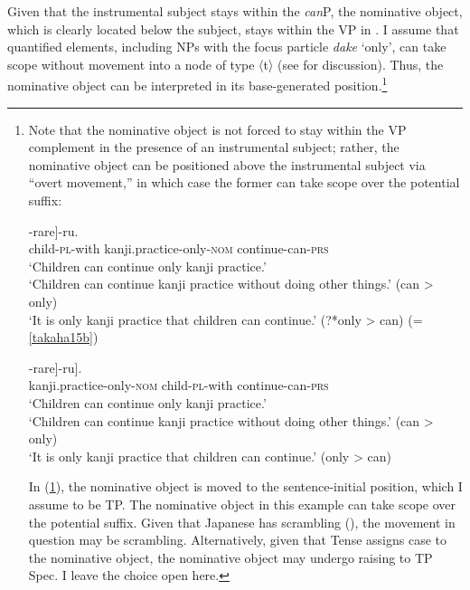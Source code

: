 \documentclass[output=paper]{langscibook}
\begin{document}
Given that the instrumental subject stays within the \emph{can}P, the nominative object, which is clearly located below the subject, stays within the VP in . I assume that quantified elements, including NPs with the focus particle \emph{dake} ‘only’, can take scope without movement into a node of type 〈t〉 (see \citealt{Blok2017} for discussion). Thus, the nominative object can be interpreted in its base-generated position.\footnote{Note that the nominative object is not forced to stay within the VP complement in the presence of an instrumental subject; rather, the nominative object can be positioned above the instrumental subject via “overt movement,” in which case the former can take scope over the potential suffix: 

\begin{exe}
\ex 
\begin{xlist}
\ex \label{takahaiaa}
\gll [$_{\textnormal{canP}}$ {Kodomo-tati-de} [$_{\textnormal{VP}}$ {kanzirensyuu-dake-ga} {tuzuke}]-{rare}]-{ru}.\\
{} child-\textsc{pl}-with {} kanji.practice-only-\textsc{nom} continue-can-\textsc{prs}\\
\glt ‘Children can continue only kanji practice.’\\
‘Children can continue kanji practice without doing other things.’ (can \textgreater{} only)\\
‘It is only kanji practice that children can continue.’ (?*only \textgreater{} can) (=\,\ref{takaha15b})

\ex \label{takahaibb}
\gll [$_{\textnormal{TP}}$ {Kanzirensyuu-dake$_{\textnormal{i}}$-ga} [$_{\textnormal{canP}}$ {kodomo-tati-de} [$_{\textnormal{VP}}$ {\textit{t}$_{\textnormal{i}}$} {tuzuke}]-{rare}]-{ru}].\\
{} kanji.practice-only-\textsc{nom} {} child-\textsc{pl}-with {} {} continue-can-\textsc{prs}\\
\glt ‘Children can continue only kanji practice.’\\
‘Children can continue kanji practice without doing other things.’ (can \textgreater{} only)\\
‘It is only kanji practice that children can continue.’ (only \textgreater{} can)
\end{xlist}
\end{exe}
In (\ref{takahaibb}), the nominative object is moved to the sentence-initial position, which I assume to be TP. The nominative object in this example can take scope over the potential suffix. Given that Japanese has scrambling (\citealt{Saito1985}), the movement in question may be scrambling. Alternatively, given that Tense assigns case to the nominative object, the nominative object may undergo raising to TP Spec. I leave the choice open here.}
\end{document}
